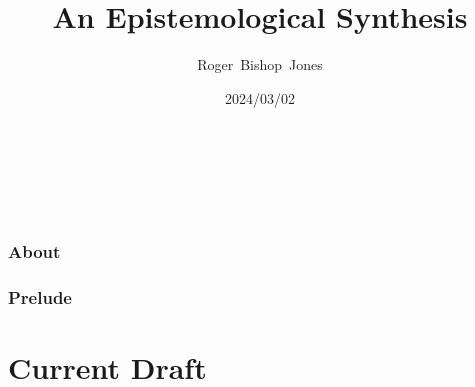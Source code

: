 \documentclass[10pt,titlepage]{book}
\title{\bf An Epistemological Synthesis}
\author{Roger~Bishop~Jones}
\date{\small 2024/03/02}
\newcommand{\ignore}[1]{}
\begin{document}
% 

                               
\begin{titlepage}
\maketitle





\end{titlepage}

\ \

\ignore{
\begin{centering}
{}
\end{centering}
}%

\setcounter{tocdepth}{2}
{\parskip-0pt\tableofcontents}


\hfill
\ 
\pagebreak







\section*{About}

\section*{Prelude}

\part{Current Draft}
  
\end{document}
